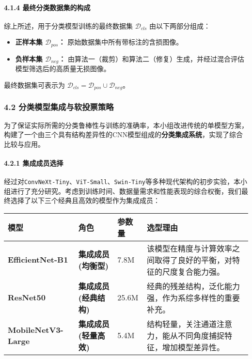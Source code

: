 \documentclass[
]{article}
\begin{document}
\paragraph{\texorpdfstring{\textbf{4.1.4
最终分类数据集的构成}}{4.1.4 最终分类数据集的构成}}\label{414-ux6700ux7ec8ux5206ux7c7bux6570ux636eux96c6ux7684ux6784ux6210}

综上所述，用于分类模型训练的最终数据集 \(\mathcal{D}_{cls}\)
由以下两部分组成：

\begin{itemize}
\item
  \textbf{正样本集 \(\mathcal{D}_{pos}\)：}
  原始数据集中所有带标注的含损图像。
\item
  \textbf{负样本集 \(\mathcal{D}_{neg}\)：}
  由算法一（裁剪）和算法二（修复）生成，并经过混合评估模型筛选后的高质量无损图像。
\end{itemize}

最终数据集可表示为
\(\mathcal{D}_{cls} = \mathcal{D}_{pos} \cup \mathcal{D}_{neg}\)。

\subsubsection{\texorpdfstring{\textbf{4.2
}分类模型集成与软投票策略}{4.2 分类模型集成与软投票策略}}\label{42-ux5206ux7c7bux6a21ux578bux96c6ux6210ux4e0eux8f6fux6295ux7968ux7b56ux7565}

为了保证实际所需的分类鲁棒性与训练的准确率，本小组改进传统的单模型方案，构建了一个由三个具有结构差异性的CNN模型组成的\textbf{分类集成系统}，实现了综合比较与应用。

\paragraph{\texorpdfstring{\textbf{4.2.1
集成成员选择}}{4.2.1 集成成员选择}}\label{421-ux96c6ux6210ux6210ux5458ux9009ux62e9}

经过对\texttt{ConvNeXt-Tiny}、\texttt{ViT-Small}、\texttt{Swin-Tiny}等多种现代架构的初步实验，本小组进行了充分研究。考虑到训练时间、数据量需求和性能表现的综合权衡，我们最终选择了以下三个经典且高效的模型作为集成成员：

\begin{longtable}[]{@{}llll@{}}
\toprule\noalign{}
模型 & 角色 & 参数量 & 选型理由 \\
\midrule\noalign{}
\endhead
\bottomrule\noalign{}
\endlastfoot
\textbf{EfficientNet-B1} & \textbf{集成成员 (均衡型)} & 7.8M &
该模型在精度与计算效率之间取得了良好的平衡，对特征的尺度复合能力强。 \\
\textbf{ResNet50} & \textbf{集成成员 (经典结构)} & 25.6M &
经典的残差结构，泛化能力强，作为系综多样性的重要补充。 \\
\textbf{MobileNetV3-Large} & \textbf{集成成员 (轻量高效)} & 5.4M &
结构轻量，关注通道注意力，能从不同角度捕捉特征，增加模型差异性。 \\
\end{longtable}
\end{document}
